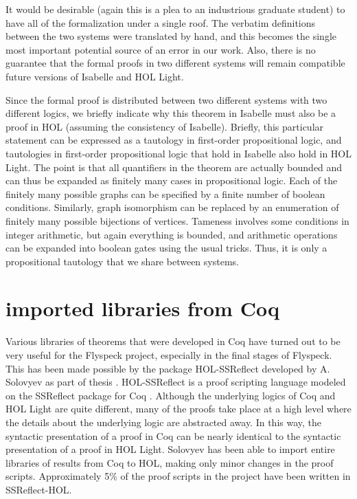It would be desirable (again this is a plea to an industrious graduate student) to have all of the formalization under a single roof.
The verbatim definitions between the two systems were translated by hand, and this becomes the single most important potential
source of an error in our work.  Also,  there is no guarantee that
the formal proofs in two different systems will remain compatible future versions of Isabelle and HOL Light.

Since the formal proof is distributed between two different systems with two different logics, we briefly indicate why
this theorem in Isabelle must also be a proof in HOL (assuming the consistency of Isabelle).  Briefly, this particular statement
can be expressed as a tautology in first-order propositional logic, and tautologies in first-order propositional logic that hold
in Isabelle also hold in HOL Light.  The point is that all quantifiers in the theorem are actually bounded and can thus be
expanded as finitely many cases in propositional logic.   Each of the finitely many possible graphs can be specified by a finite number of
boolean conditions.  Similarly, graph isomorphism can be replaced by an enumeration of finitely
many possible bijections of vertices.  
Tameness involves some conditions in integer arithmetic, but again everything is bounded, 
and arithmetic operations can be expanded into boolean gates using the usual tricks.    Thus, it is only a propositional tautology
that we share between systems.



\section{imported libraries from Coq}

Various libraries of theorems that were developed in Coq have turned out to be very useful for the Flyspeck project, 
especially in the final stages of Flyspeck.  This has been made possible by the package HOL-SSReflect developed by
 A. Solovyev as part of thesis \cite{XX}.  HOL-SSReflect is a proof scripting language modeled on the SSReflect 
package for Coq \cite{XX}.  Although the underlying logics of Coq and HOL Light are quite different, 
many of the proofs take place at a high level where the details about the underlying logic are abstracted away.  
In this way, the syntactic presentation of a proof in Coq can be nearly identical to the syntactic 
presentation of a proof in HOL Light.  Solovyev has been able to import entire libraries of results from 
Coq to HOL, making only minor changes in the proof scripts.  
Approximately 5\% of the proof scripts in the project have been written in SSReflect-HOL.

